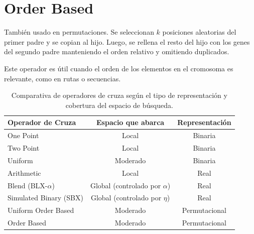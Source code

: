 \section{Order Based}

También usado en permutaciones. Se seleccionan $k$ posiciones aleatorias del primer padre y se copian al hijo. Luego, se rellena el resto del hijo con los genes del segundo padre manteniendo el orden relativo y omitiendo duplicados.

Este operador es útil cuando el orden de los elementos en el cromosoma es relevante, como en rutas o secuencias.

\begin{table}[H]
	\centering
	\begin{tabular}{|l|c|c|}
		\hline
		\textbf{Operador de Cruza} & \textbf{Espacio que abarca} & \textbf{Representación}  \\ \hline
		One Point                  & Local                        & Binaria             \\ \hline
		Two Point                  & Local                        & Binaria             \\ \hline
		Uniform                    & Moderado                     & Binaria             \\ \hline
		Arithmetic                 & Local                        & Real                \\ \hline
		Blend (BLX-$\alpha$)       & Global (controlado por $\alpha$) & Real          \\ \hline
		Simulated Binary (SBX)     & Global (controlado por $\eta$)   & Real          \\ \hline
		Uniform Order Based        & Moderado                     & Permutacional       \\ \hline
		Order Based                & Moderado                     & Permutacional       \\ \hline
	\end{tabular}
	\caption{Comparativa de operadores de cruza según el tipo de representación y cobertura del espacio de búsqueda.}
	\label{tab:cross_comparison}
\end{table}

